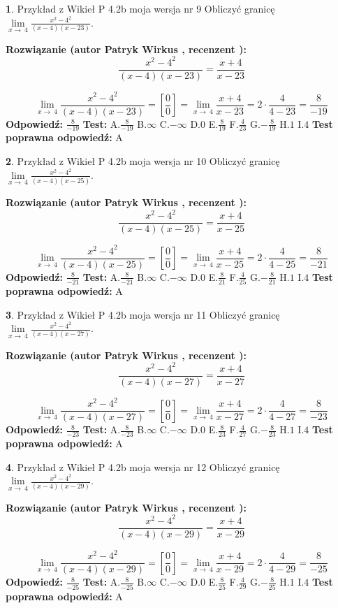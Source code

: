 \documentclass[12pt, a4paper]{article}
\theoremstyle{definition} %
\newtheorem{zad}{}
\newcommand{\zadStart}[1]{\begin{zad}#1\newline}
\newcommand{\zadStop}{\end{zad}}
\newcommand{\rozwStart}[2]{\noindent \textbf{Rozwiązanie (autor #1 , recenzent #2): }\newline}
\newcommand{\rozwStop}{\newline}
\newcommand{\odpStart}{\noindent \textbf{Odpowiedź:}\newline}
\newcommand{\odpStop}{\newline}
\newcommand{\testStart}{\noindent \textbf{Test:}\newline}
\newcommand{\testStop}{\newline}
\newcommand{\kluczStart}{\noindent \textbf{Test poprawna odpowiedź:}\newline}
\newcommand{\kluczStop}{\newline}
\begin{document}
\zadStart{Przykład z Wikieł P 4.2b moja wersja nr 9}
Obliczyć granicę $\lim\limits_{x\to\ 4}\frac{x^{2}-4^{2}}{(x-4)(x-23)}$.
\zadStop
\rozwStart{Patryk Wirkus}{}
$$\frac{x^{2}-4^{2}}{(x-4)(x-23)}=\frac{x+4}{x-23}$$

$$\lim\limits_{x\to\ 4}\frac{x^{2}-4^{2}}{(x-4)(x-23)}=[\frac{0}{0}]=\lim\limits_{x\to\ 4}\frac{x+4}{x-23}=2 \cdot \frac{4}{4-23} = \frac{8}{-19}$$
\rozwStop
\odpStart
$\frac{8}{-19}$
\odpStop
\testStart
A.$\frac{8}{-19}$
B.$\infty$
C.$-\infty$
D.$0$
E.$\frac{8}{19}$
F.$\frac{4}{23}$
G.$-\frac{8}{19}$
H.$1$
I.$4$
\testStop
\kluczStart
A
\kluczStop



\zadStart{Przykład z Wikieł P 4.2b moja wersja nr 10}
Obliczyć granicę $\lim\limits_{x\to\ 4}\frac{x^{2}-4^{2}}{(x-4)(x-25)}$.
\zadStop
\rozwStart{Patryk Wirkus}{}
$$\frac{x^{2}-4^{2}}{(x-4)(x-25)}=\frac{x+4}{x-25}$$

$$\lim\limits_{x\to\ 4}\frac{x^{2}-4^{2}}{(x-4)(x-25)}=[\frac{0}{0}]=\lim\limits_{x\to\ 4}\frac{x+4}{x-25}=2 \cdot \frac{4}{4-25} = \frac{8}{-21}$$
\rozwStop
\odpStart
$\frac{8}{-21}$
\odpStop
\testStart
A.$\frac{8}{-21}$
B.$\infty$
C.$-\infty$
D.$0$
E.$\frac{8}{21}$
F.$\frac{4}{25}$
G.$-\frac{8}{21}$
H.$1$
I.$4$
\testStop
\kluczStart
A
\kluczStop



\zadStart{Przykład z Wikieł P 4.2b moja wersja nr 11}
Obliczyć granicę $\lim\limits_{x\to\ 4}\frac{x^{2}-4^{2}}{(x-4)(x-27)}$.
\zadStop
\rozwStart{Patryk Wirkus}{}
$$\frac{x^{2}-4^{2}}{(x-4)(x-27)}=\frac{x+4}{x-27}$$

$$\lim\limits_{x\to\ 4}\frac{x^{2}-4^{2}}{(x-4)(x-27)}=[\frac{0}{0}]=\lim\limits_{x\to\ 4}\frac{x+4}{x-27}=2 \cdot \frac{4}{4-27} = \frac{8}{-23}$$
\rozwStop
\odpStart
$\frac{8}{-23}$
\odpStop
\testStart
A.$\frac{8}{-23}$
B.$\infty$
C.$-\infty$
D.$0$
E.$\frac{8}{23}$
F.$\frac{4}{27}$
G.$-\frac{8}{23}$
H.$1$
I.$4$
\testStop
\kluczStart
A
\kluczStop



\zadStart{Przykład z Wikieł P 4.2b moja wersja nr 12}
Obliczyć granicę $\lim\limits_{x\to\ 4}\frac{x^{2}-4^{2}}{(x-4)(x-29)}$.
\zadStop
\rozwStart{Patryk Wirkus}{}
$$\frac{x^{2}-4^{2}}{(x-4)(x-29)}=\frac{x+4}{x-29}$$

$$\lim\limits_{x\to\ 4}\frac{x^{2}-4^{2}}{(x-4)(x-29)}=[\frac{0}{0}]=\lim\limits_{x\to\ 4}\frac{x+4}{x-29}=2 \cdot \frac{4}{4-29} = \frac{8}{-25}$$
\rozwStop
\odpStart
$\frac{8}{-25}$
\odpStop
\testStart
A.$\frac{8}{-25}$
B.$\infty$
C.$-\infty$
D.$0$
E.$\frac{8}{25}$
F.$\frac{4}{29}$
G.$-\frac{8}{25}$
H.$1$
I.$4$
\testStop
\kluczStart
A
\kluczStop
\end{document}
